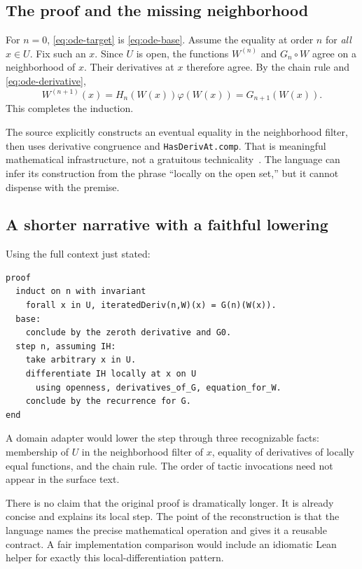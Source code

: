 \documentclass[11pt,a4paper]{article}
\newcommand{\code}[1]{\texttt{#1}}
\theoremstyle{remark}
\begin{document}
\subsection{The proof and the missing neighborhood}

For $n=0$, \eqref{eq:ode-target} is \eqref{eq:ode-base}. Assume the equality at order $n$ for \emph{all} $x\in U$. Fix such an $x$. Since $U$ is open, the functions $W^{(n)}$ and $G_n\circ W$ agree on a neighborhood of $x$. Their derivatives at $x$ therefore agree. By the chain rule and \eqref{eq:ode-derivative},
\[
W^{(n+1)}(x)
=H_n(W(x))\varphi(W(x))
=G_{n+1}(W(x)).
\]
This completes the induction.

The source explicitly constructs an eventual equality in the neighborhood filter, then uses derivative congruence and \code{HasDerivAt.comp}. That is meaningful mathematical infrastructure, not a gratuitous technicality~\cite{proveit-deriv}. The language can infer its construction from the phrase ``locally on the open set,'' but it cannot dispense with the premise.

\subsection{A shorter narrative with a faithful lowering}

Using the full context just stated:
\begin{lstlisting}[caption={The induction invariant quantifies over the entire open set.}]
proof
  induct on n with invariant
    forall x in U, iteratedDeriv(n,W)(x) = G(n)(W(x)).
  base:
    conclude by the zeroth derivative and G0.
  step n, assuming IH:
    take arbitrary x in U.
    differentiate IH locally at x on U
      using openness, derivatives_of_G, equation_for_W.
    conclude by the recurrence for G.
end
\end{lstlisting}
A domain adapter would lower the step through three recognizable facts: membership of $U$ in the neighborhood filter of $x$, equality of derivatives of locally equal functions, and the chain rule. The order of tactic invocations need not appear in the surface text.

There is no claim that the original proof is dramatically longer. It is already concise and explains its local step. The point of the reconstruction is that the language names the precise mathematical operation and gives it a reusable contract. A fair implementation comparison would include an idiomatic Lean helper for exactly this local-differentiation pattern.
\end{document}
